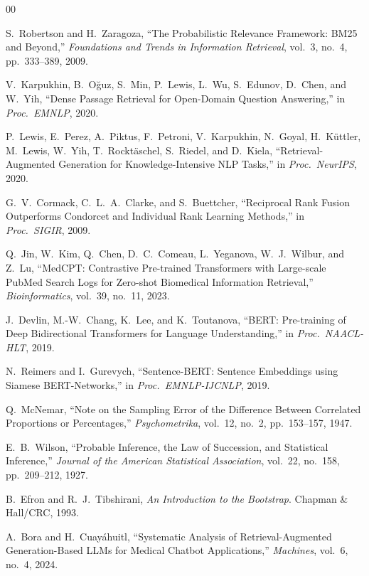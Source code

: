 \documentclass[10pt,conference]{IEEEtran}
\begin{document}
\footnotesize
\begin{thebibliography}{00}

S.~Robertson and H.~Zaragoza, ``The Probabilistic Relevance Framework: BM25 and Beyond,'' \emph{Foundations and Trends in Information Retrieval}, vol.~3, no.~4, pp.~333--389, 2009.

V.~Karpukhin, B.~O\u{g}uz, S.~Min, P.~Lewis, L.~Wu, S.~Edunov, D.~Chen, and W.~Yih, ``Dense Passage Retrieval for Open-Domain Question Answering,'' in \emph{Proc.\ EMNLP}, 2020.

P.~Lewis, E.~Perez, A.~Piktus, F.~Petroni, V.~Karpukhin, N.~Goyal, H.~K\"uttler, M.~Lewis, W.~Yih, T.~Rockt\"aschel, S.~Riedel, and D.~Kiela, ``Retrieval-Augmented Generation for Knowledge-Intensive NLP Tasks,'' in \emph{Proc.\ NeurIPS}, 2020.

G.~V.~Cormack, C.~L.~A.~Clarke, and S.~Buettcher, ``Reciprocal Rank Fusion Outperforms Condorcet and Individual Rank Learning Methods,'' in \emph{Proc.\ SIGIR}, 2009.

Q.~Jin, W.~Kim, Q.~Chen, D.~C.~Comeau, L.~Yeganova, W.~J.~Wilbur, and Z.~Lu, ``MedCPT: Contrastive Pre-trained Transformers with Large-scale PubMed Search Logs for Zero-shot Biomedical Information Retrieval,'' \emph{Bioinformatics}, vol.~39, no.~11, 2023.

J.~Devlin, M.-W.~Chang, K.~Lee, and K.~Toutanova, ``BERT: Pre-training of Deep Bidirectional Transformers for Language Understanding,'' in \emph{Proc.\ NAACL-HLT}, 2019.

N.~Reimers and I.~Gurevych, ``Sentence-BERT: Sentence Embeddings using Siamese BERT-Networks,'' in \emph{Proc.\ EMNLP-IJCNLP}, 2019.

Q.~McNemar, ``Note on the Sampling Error of the Difference Between Correlated Proportions or Percentages,'' \emph{Psychometrika}, vol.~12, no.~2, pp.~153--157, 1947.

E.~B.~Wilson, ``Probable Inference, the Law of Succession, and Statistical Inference,'' \emph{Journal of the American Statistical Association}, vol.~22, no.~158, pp.~209--212, 1927.

B.~Efron and R.~J.~Tibshirani, \emph{An Introduction to the Bootstrap}. Chapman \& Hall/CRC, 1993.

A.~Bora and H.~Cuay\'ahuitl, ``Systematic Analysis of Retrieval-Augmented Generation-Based LLMs for Medical Chatbot Applications,'' \emph{Machines}, vol.~6, no.~4, 2024.


\end{thebibliography}
\end{document}
